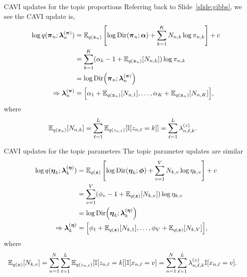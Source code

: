 \documentclass[aspectratio=169]{beamer}
\begin{document}
\begin{frame}{CAVI updates for the topic proportions}
Referring back to Slide~\ref{slide:gibbs}, we see the CAVI update is,
\begin{align}
    \log q(\boldsymbol{\pi}_{n}; \boldsymbol{\lambda}^{(\boldsymbol{\pi})}_{n}) &=
    \mathbb{E}_{q(\boldsymbol{z}_n)} \left[ \log \mathrm{Dir}(\boldsymbol{\pi}_n; \boldsymbol{\alpha}) + \sum_{k=1}^K N_{n,k} \log \pi_{n,k} \right] + c \\
    &= \sum_{k=1}^K (\alpha_k - 1 + \mathbb{E}_{q(\boldsymbol{z}_n)}[N_{n,k}]) \log \pi_{n,k} \\
    &= \log \mathrm{Dir}\Big(\boldsymbol{\pi}_n; \boldsymbol{\lambda}_n^{(\boldsymbol{\pi})} \Big) \\
    \Rightarrow \boldsymbol{\lambda}^{(\boldsymbol{\pi})}_n &= \Big[\alpha_1 + \mathbb{E}_{q(\boldsymbol{z}_n)}[N_{n,1}], \ldots, \alpha_K + \mathbb{E}_{q(\boldsymbol{z}_n)}[N_{n,K}] \Big],
\end{align}
where
\begin{align}
    \mathbb{E}_{q(\boldsymbol{z}_n)}[N_{n,k}] 
    &= \sum_{\ell=1}^L \mathbb{E}_{q(z_{n,\ell})}[\mathbb{I}[z_{n,\ell}=k]]
    = \sum_{\ell=1}^L \lambda_{n,\ell,k}^{(z)}.
\end{align}
\end{frame}

\begin{frame}{CAVI updates for the topic parameters}
The topic parameter updates are similar
\begin{align}
    \log q(\boldsymbol{\eta}_k; \boldsymbol{\lambda}^{(\boldsymbol{\eta})}_k) &=
    \mathbb{E}_{q(\boldsymbol{z})} \left[ \log \mathrm{Dir}(\boldsymbol{\eta}_k; \boldsymbol{\phi}) + \sum_{v=1}^V N_{k,v} \log \eta_{k,v} \right] + c \\
    &= \sum_{v=1}^V (\phi_v - 1 + \mathbb{E}_{q(\boldsymbol{z})}[N_{k,v}]) \log \eta_{k,v} \\
    &= \log \mathrm{Dir}\Big(\boldsymbol{\eta}_k; \boldsymbol{\lambda}^{(\boldsymbol{\eta})}_k \Big) \\
    \Rightarrow \boldsymbol{\lambda}^{(\boldsymbol{\eta})}_k &= \Big[\phi_1 + \mathbb{E}_{q(\boldsymbol{z})}[N_{k,1}], \ldots, \phi_V + \mathbb{E}_{q(\boldsymbol{z})}[N_{k,V}] \Big],
\end{align}
where
\begin{align}
    \mathbb{E}_{q(\boldsymbol{z})}[N_{k,v}] 
    &= \sum_{n=1}^N \sum_{\ell=1}^L \mathbb{E}_{q(z_{n,\ell})}[\mathbb{I}[z_{n,\ell}=k]] \mathbb{I}[x_{n, \ell} = v]
    = \sum_{n=1}^N \sum_{\ell=1}^L \lambda_{n,\ell,k}^{(z)} \mathbb{I}[x_{n, \ell} = v].
\end{align}
\end{frame}
\end{document}
